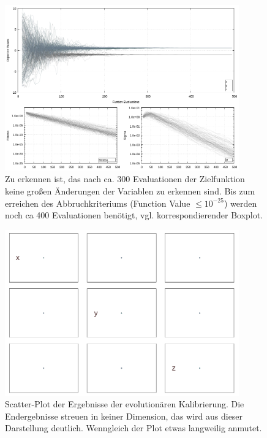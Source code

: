 \begin{figure}[!ht]
  \begin{center}
    \caption[Linien-Plot der Endergebnisse der Kalibierung]{Zu erkennen ist, das nach ca. 300 Evaluationen der Zielfunktion keine großen Änderungen der Variablen zu erkennen sind. Bis zum erreichen des Abbruchkriteriums (Function Value $\leq10^{-25}$) werden noch ca 400 Evaluationen benötigt, vgl. korrespondierender Boxplot.}
    \label{fig:Final_Calibration_Ant0_ES-Lines}  
    \includegraphics[width=0.9\textwidth]{img/calibration/calibration_ant0-lines.png}
  \end{center}
%  
\end{figure}
%
\begin{figure}[!ht]
  \begin{center}
  
    \caption[Kalibierung Scatter-Plot]{Scatter-Plot der Ergebnisse der evolutionären Kalibrierung. Die Endergebnisse streuen in keiner Dimension, das wird aus dieser Darstellung deutlich. Wenngleich der Plot etwas langweilig anmutet.}
    \label{fig:Final_Calibration_Ant0_ES-Scatter}  
    \includegraphics[width=0.9\textwidth]{img/calibration/calibration_ant0-scatter.png}
  \end{center}
%  
\end{figure}
